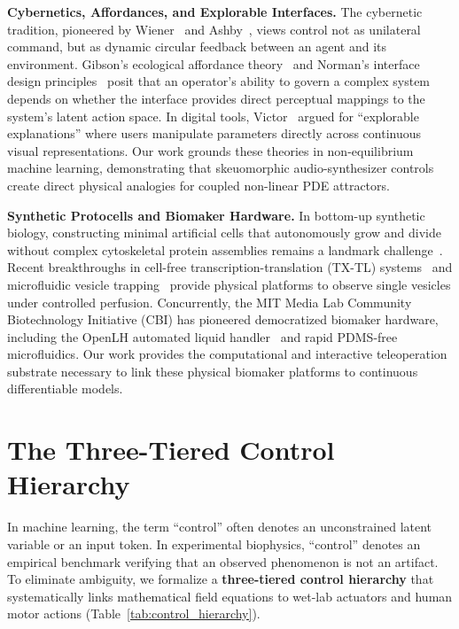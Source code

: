 \documentclass{article}
\begin{document}
\textbf{Cybernetics, Affordances, and Explorable Interfaces.} The cybernetic tradition, pioneered by Wiener~\citep{wiener1948cybernetics} and Ashby~\citep{ashby1956introduction}, views control not as unilateral command, but as dynamic circular feedback between an agent and its environment. Gibson's ecological affordance theory~\citep{gibson1979ecological} and Norman's interface design principles~\citep{norman1988design} posit that an operator's ability to govern a complex system depends on whether the interface provides direct perceptual mappings to the system's latent action space. In digital tools, Victor~\citep{victor2011explorable} argued for ``explorable explanations'' where users manipulate parameters directly across continuous visual representations. Our work grounds these theories in non-equilibrium machine learning, demonstrating that skeuomorphic audio-synthesizer controls create direct physical analogies for coupled non-linear PDE attractors.

\textbf{Synthetic Protocells and Biomaker Hardware.} In bottom-up synthetic biology, constructing minimal artificial cells that autonomously grow and divide without complex cytoskeletal protein assemblies remains a landmark challenge~\citep{rasmussen2004transitions, adamala2026spudcell}. Recent breakthroughs in cell-free transcription-translation (TX-TL) systems~\citep{noireaux2004vesicle} and microfluidic vesicle trapping~\citep{robinson2013microfluidic} provide physical platforms to observe single vesicles under controlled perfusion. Concurrently, the MIT Media Lab Community Biotechnology Initiative (CBI) has pioneered democratized biomaker hardware, including the OpenLH automated liquid handler~\citep{kong2020openlh} and rapid PDMS-free microfluidics. Our work provides the computational and interactive teleoperation substrate necessary to link these physical biomaker platforms to continuous differentiable models.

\section{The Three-Tiered Control Hierarchy}
\label{sec:hierarchy}

In machine learning, the term ``control'' often denotes an unconstrained latent variable or an input token. In experimental biophysics, ``control'' denotes an empirical benchmark verifying that an observed phenomenon is not an artifact. To eliminate ambiguity, we formalize a \textbf{three-tiered control hierarchy} that systematically links mathematical field equations to wet-lab actuators and human motor actions (Table~\ref{tab:control_hierarchy}).
\end{document}
